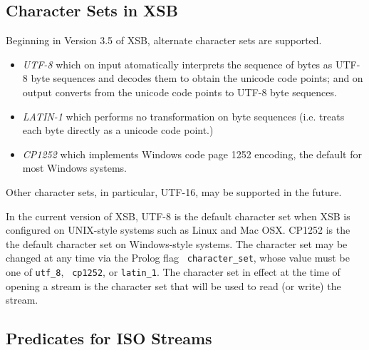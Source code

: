 \subsection{Character Sets in XSB}\label{sec-charsets}
%
Beginning in Version 3.5 of XSB, alternate character sets are supported.  
%
\begin{itemize}
\item {\em UTF-8} which on input atomatically interprets the sequence
of bytes as UTF-8 byte sequences and decodes them to obtain the
unicode code points; and on output converts from the unicode code
points to UTF-8 byte sequences.
%
\item {\em LATIN-1} which performs no transformation on byte sequences 
(i.e. treats each byte directly as a unicode code point.)
%
\item {\em CP1252} which implements Windows code page 1252 encoding, the 
default for most Windows systems.
\end{itemize}

Other character sets, in particular, UTF-16, may be supported in the
future.

In the current version of XSB, UTF-8 is the default character set when
XSB is configured on UNIX-style systems such as Linux and Mac OSX.
CP1252 is the the default character set on Windows-style systems.  The
character set may be changed at any time via the Prolog flag {\tt
  character\_set}, whose value must be one of {\tt utf\_8}, {\tt
  cp1252}, or {\tt latin\_1}.  The character set in effect at the time
of opening a stream is the character set that will be used to read (or
write) the stream.

\subsection{Predicates for ISO Streams}

